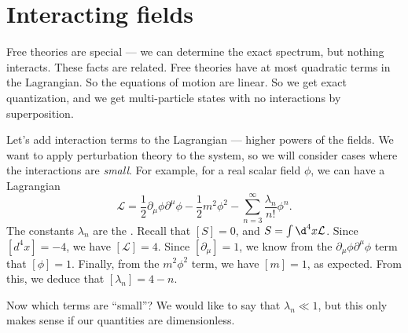 \documentclass[a4paper]{article}
\begin{document}
\section{Interacting fields}
Free theories are special --- we can determine the exact spectrum, but nothing interacts. These facts are related. Free theories have at most quadratic terms in the Lagrangian. So the equations of motion are linear. So we get exact quantization, and we get multi-particle states with no interactions by superposition.

Let's add interaction terms to the Lagrangian --- higher powers of the fields. We want to apply perturbation theory to the system, so we will consider cases where the interactions are \emph{small}. For example, for a real scalar field $\phi$, we can have a Lagrangian
\[
  \mathcal{L} = \frac{1}{2} \partial_\mu \phi \partial^\mu \phi - \frac{1}{2}m^2 \phi^2 - \sum_{n = 3}^\infty \frac{\lambda_n}{n!} \phi^n.
\]
The constants $\lambda_n$ are the . Recall that $[S] = 0$, and $S = \int \d^4 x \mathcal{L}$. Since $[d^4 x] = -4$, we have $[\mathcal{L}] = 4$.
Since $[\partial_\mu] = 1$, we know from the $\partial_\mu \phi \partial^\mu \phi$ term that $[\phi] = 1$. Finally, from the $m^2 \phi^2$ term, we have $[m] = 1$, as expected. From this, we deduce that $[\lambda_n] = 4 - n$.

Now which terms are ``small''? We would like to say that $\lambda_n \ll 1$, but this only makes sense if our quantities are dimensionless.
\end{document}
